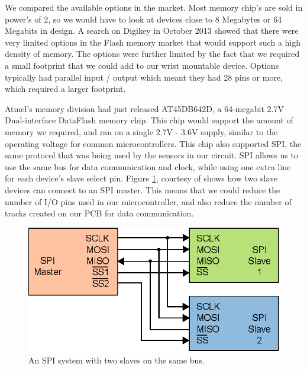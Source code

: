 We compared the available options in the market. Most memory chip's are sold in power's of 2, so we would have to look at devices close to 8 Megabytes or 64 Megabits in design.
A search on Digikey \cite{Web:DigiKeyWebsite} in October 2013 showed that there were very limited options in the Flash memory market that would support such a high density of memory. The options were further limited by the fact that we required a small footprint that we could add to our wrist mountable device. Options typically had parallel input / output which meant they had 28 pins or more, which required a larger footprint.

Atmel's memory division had just released AT45DB642D, a 64-megabit 2.7V Dual-interface DataFlash memory chip. This chip would support the amount of memory we required, and ran on a single 2.7V - 3.6V supply, similar to the operating voltage for common microcontrollers. This chip also supported SPI, the same protocol that was being used by the sensors in our circuit. SPI allows us to use the same bus for data communication and clock, while using one extra line for each device's slave select pin. Figure \ref{Fig:SPISLAVES}, courtesy of \cite{Web:WikiCBurnett} shows how two slave devices can connect to an SPI master. This means that we could reduce the number of I/O pins used in our microcontroller, and also reduce the number of tracks created on our PCB for data communication.

\begin{figure}
\begin{center}
\includegraphics{images/SPI_SLAVES.eps}
\caption{An SPI system with two slaves on the same bus.}
\label{Fig:SPISLAVES}
\end{center}
\end{figure}

